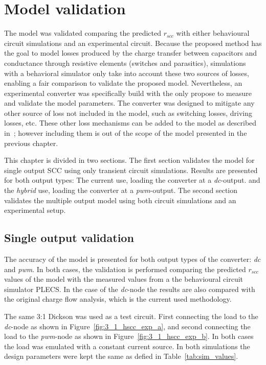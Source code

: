 \chapter{Model validation}
The model was validated comparing the predicted $r_{scc}$ with either behavioural circuit simulations and an experimental circuit.  Because the proposed method has the goal to model losses produced by the charge transfer between capacitors and conductance through resistive elements (switches and parasitics), simulations with a behavioral simulator only take into account these two sources of losses, enabling a fair comparison to validate the proposed model.  Nevertheless, an experimental converter was specifically build with the only propose to measure and validate the model parameters. The converter was designed to mitigate any other source of loss not included in the model, such as switching losses, driving losses, etc. These other loss mechanisms can be added to the model as described in~\cite{Seeman:EECS-2009-78}; however including them is out of the scope of the model presented in the previous chapter.

This chapter is divided in two sections. The first section validates the model for single output SCC using only transient circuit simulations. Results are presented for both output types: The current use, loading the converter at a \emph{dc}-output. and the \emph{hybrid} use, loading the converter at a \emph{pwm}-output.  The second section validates the multiple output model using both circuit simulations and an experimental setup.

\section{Single output validation}
The accuracy of the model is presented for both output types of the converter:
\emph{dc} and \emph{pwm}. In both cases, the validation is performed comparing the predicted $r_{scc}$ values of the model with the measured values from a the behavioural circuit simulator PLECS. In the case of the \emph{dc}-node the results are also compared with the original charge flow analysis, which is the current used methodology.

The same 3:1 Dickson was used as a test circuit. First connecting the load to the \emph{dc}-node as shown in Figure~\ref{fig:3_1_hscc_exp_a}, and second connecting the load to the \emph{pwm}-node as shown in Figure~\ref{fig:3_1_hscc_exp_b}. In both cases the load was emulated with a constant current source. In both simulations the design parameters were kept the same as defied in Table~\ref{tab:sim_values}.

